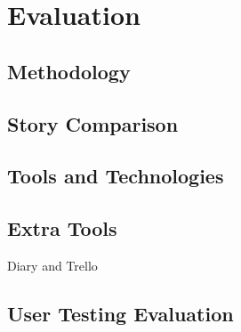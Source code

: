\chapter{Evaluation}

\section{Methodology}
\section{Story Comparison}
\section{Tools and Technologies}
\section{Extra Tools}
Diary and Trello
\section{User Testing Evaluation}